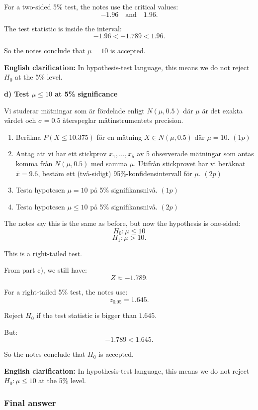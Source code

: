 \documentclass[10pt]{article}
\begin{document}
For a two-sided 5\% test, the notes use the
critical values:
\[
-1.96
\quad\text{and}\quad
1.96.
\]

The test statistic is inside the interval:
\[
-1.96 < -1.789 < 1.96.
\]

So the notes conclude that \(\mu=10\) is accepted.

\textbf{English clarification:}
In hypothesis-test language, this means we do not
reject \(H_0\) at the 5\% level.

\textbf{d) Test \(\mu \le 10\) at 5\% significance}

Vi studerar mätningar som är fördelade enligt
\(N(\mu,0.5)\) där \(\mu\) är det exakta värdet
och \(\sigma = 0.5\) återspeglar mätinstrumentets
precision.

\begin{enumerate}[label=\alph*)]
\item Beräkna \(P(X \le 10.375)\) för en mätning
\(X \in N(\mu,0.5)\) där \(\mu = 10\). \((1p)\)

\item Antag att vi har ett stickprov
\(x_1,\ldots,x_5\) av 5 observerade mätningar som
antas komma från \(N(\mu,0.5)\) med samma \(\mu\).
Utifrån stickprovet har vi beräknat \(\bar{x}=9.6\),
bestäm ett (två-sidigt) 95\%-konfidensintervall
för \(\mu\). \((2p)\)

\item Testa hypotesen \(\mu = 10\) på
5\% signifikansnivå. \((1p)\)

\item Testa hypotesen \(\mu \le 10\) på
5\% signifikansnivå. \((2p)\)
\end{enumerate}

The notes say this is the same as before, but now
the hypothesis is one-sided:
\[
H_0:\mu\le 10
\]
\[
H_1:\mu>10.
\]

This is a right-tailed test.

From part c), we still have:
\[
Z\approx -1.789.
\]

For a right-tailed 5\% test, the notes use:
\[
z_{0.05}=1.645.
\]

Reject \(H_0\) if the test statistic is bigger
than \(1.645\).

But:
\[
-1.789 < 1.645.
\]

So the notes conclude that \(H_0\) is accepted.

\textbf{English clarification:}
In hypothesis-test language, this means we do not
reject \(H_0:\mu\le 10\) at the 5\% level.

\subsubsection*{Final answer}
\end{document}
